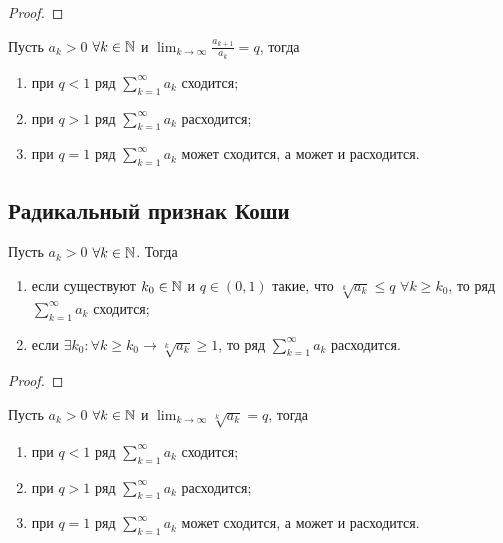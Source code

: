 	\begin{proof}
	\end{proof}
	
	\begin{corollary}
		Пусть $a_k > 0$ $\forall k \in \mathbb N$ и $\displaystyle \lim_{k \to \infty} {\frac{a_{k + 1}}{a_k}} = q$, тогда
		
		\begin{enumerate}
			\item при $q < 1$ ряд $\displaystyle \sum_{k = 1}^{\infty} {a_k}$ сходится;
			\item при $q > 1$ ряд $\displaystyle \sum_{k = 1}^{\infty} {a_k}$ расходится;
			\item при $q = 1$ ряд $\displaystyle \sum_{k = 1}^{\infty} {a_k}$ может сходится, а может и расходится.
		\end{enumerate}
	\end{corollary}
	
	\subsection{Радикальный признак Коши}
	
	\begin{theorem}
		Пусть $a_k > 0$ $\forall k \in \mathbb N$. Тогда
		\begin{enumerate}
			\item если существуют $k_0 \in \mathbb N$ и $q \in (0, 1)$ такие, что $\sqrt[k]{a_k} \leqslant q$ $\forall k \geqslant k_0$, то ряд $\displaystyle \sum_{k = 1}^{\infty} {a_k}$ сходится;
			\item если $\exists k_0: \forall k \geqslant k_0 \rightarrow \sqrt[k]{a_k} \geqslant 1$, то ряд $\displaystyle \sum_{k = 1}^{\infty} {a_k}$ расходится.
		\end{enumerate}
	\end{theorem}
	
	\begin{proof}
	\end{proof}
	
	\begin{corollary}
		Пусть $a_k > 0$ $\forall k \in \mathbb N$ и $\displaystyle \lim_{k \to \infty} {\sqrt[k]{a_k}} = q$, тогда
		
		\begin{enumerate}
			\item при $q < 1$ ряд $\displaystyle \sum_{k = 1}^{\infty} {a_k}$ сходится;
			\item при $q > 1$ ряд $\displaystyle \sum_{k = 1}^{\infty} {a_k}$ расходится;
			\item при $q = 1$ ряд $\displaystyle \sum_{k = 1}^{\infty} {a_k}$ может сходится, а может и расходится.
		\end{enumerate}
	\end{corollary}
	
